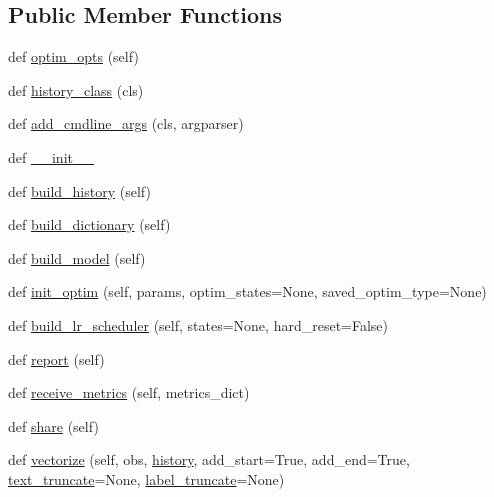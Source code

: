 \subsection*{Public Member Functions}
\begin{DoxyCompactItemize}
\item 
def \hyperlink{classparlai_1_1core_1_1torch__agent_1_1TorchAgent_a9c622b8ed5a811841f30fe98cc297cde}{optim\+\_\+opts} (self)
\item 
def \hyperlink{classparlai_1_1core_1_1torch__agent_1_1TorchAgent_a0bd9118252c602bb9d5a596ecae16717}{history\+\_\+class} (cls)
\item 
def \hyperlink{classparlai_1_1core_1_1torch__agent_1_1TorchAgent_a4a72bdd07d2cb5ce402d0058140cad0d}{add\+\_\+cmdline\+\_\+args} (cls, argparser)
\item 
def \hyperlink{classparlai_1_1core_1_1torch__agent_1_1TorchAgent_afc9c818413b776a498c2bcc0bfe3c6f7}{\+\_\+\+\_\+init\+\_\+\+\_\+}
\item 
def \hyperlink{classparlai_1_1core_1_1torch__agent_1_1TorchAgent_ab22f61f153b522f429210c61eed2d5af}{build\+\_\+history} (self)
\item 
def \hyperlink{classparlai_1_1core_1_1torch__agent_1_1TorchAgent_a233316f9ec2805dd6a08fbf07f3a078a}{build\+\_\+dictionary} (self)
\item 
def \hyperlink{classparlai_1_1core_1_1torch__agent_1_1TorchAgent_a9a21fa33fa5b2b928024fbc67826f233}{build\+\_\+model} (self)
\item 
def \hyperlink{classparlai_1_1core_1_1torch__agent_1_1TorchAgent_a3784f1ddaa6ffad009716910f3f36dd4}{init\+\_\+optim} (self, params, optim\+\_\+states=None, saved\+\_\+optim\+\_\+type=None)
\item 
def \hyperlink{classparlai_1_1core_1_1torch__agent_1_1TorchAgent_aa51ac42dc34e3d2281a01cba78a96151}{build\+\_\+lr\+\_\+scheduler} (self, states=None, hard\+\_\+reset=False)
\item 
def \hyperlink{classparlai_1_1core_1_1torch__agent_1_1TorchAgent_ac694770cd4022eb047bf6fbb8f46035c}{report} (self)
\item 
def \hyperlink{classparlai_1_1core_1_1torch__agent_1_1TorchAgent_a02beaaedfa30463f9d0a97ea590b516f}{receive\+\_\+metrics} (self, metrics\+\_\+dict)
\item 
def \hyperlink{classparlai_1_1core_1_1torch__agent_1_1TorchAgent_a373f0e276bf7c9d914a4e3363e9c2712}{share} (self)
\item 
def \hyperlink{classparlai_1_1core_1_1torch__agent_1_1TorchAgent_a48bb9b153353a0565ab7253dc1daef99}{vectorize} (self, obs, \hyperlink{classparlai_1_1core_1_1torch__agent_1_1TorchAgent_a0484b0246f0a930adc575899cdef033c}{history}, add\+\_\+start=True, add\+\_\+end=True, \hyperlink{classparlai_1_1core_1_1torch__agent_1_1TorchAgent_ae3a69ecb5f20ce4f8a09c05c5f6f4376}{text\+\_\+truncate}=None, \hyperlink{classparlai_1_1core_1_1torch__agent_1_1TorchAgent_adbdd7cf2deb2c43d982c57852b83e685}{label\+\_\+truncate}=None)

\end{DoxyCompactItemize}
